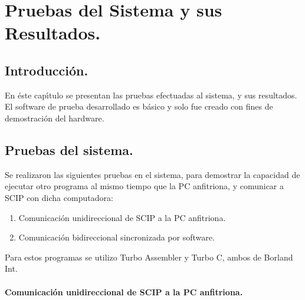 \chapter[Pruebas del Sistema y sus Resultados.]{Pruebas del Sistema y sus Resultados.}
\label{Capitulo:pruebas}


\fancyhead[LE,RO]{\thepage}


\section{Introducci\'on.}
\label{Section:intropruebas}

En \'este cap\'{\i}tulo se presentan las pruebas efectuadas al sistema, y sus resultados. El %
software de prueba desarrollado es b\'asico y solo fue creado con fines de demostraci\'on del %
hardware.


\section{Pruebas del sistema.}
\label{Section:pruebas}

Se realizaron las siguientes pruebas en el sistema, para demostrar la capacidad de ejecutar otro %
programa al mismo tiempo que la PC anfitriona, y comunicar a SCIP con dicha computadora:

\begin{enumerate}
\item Comunicaci\'on unidireccional de SCIP a la PC anfitriona.
\item Comunicaci\'on bidireccional sincronizada por software.
\end{enumerate}

Para estos programas se utilizo Turbo Assembler y Turbo C, ambos de Borland Int.


\subsubsection{Comunicaci\'on unidireccional de SCIP a la PC anfitriona.}
\label{Subsubsection:prueba1}

